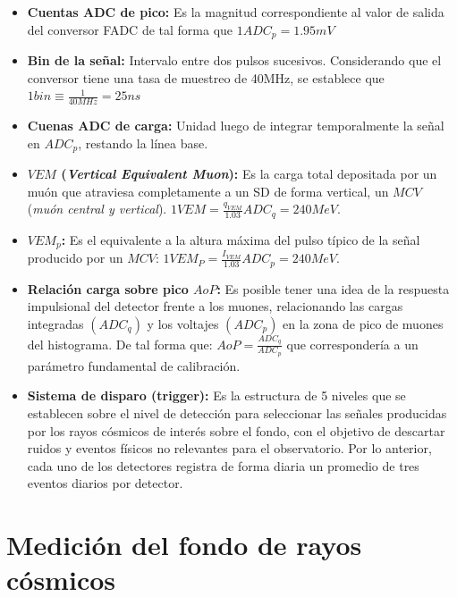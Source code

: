 \begin{itemize}
    \item \textbf{Cuentas ADC de pico:} Es la magnitud correspondiente al valor de salida del conversor FADC de tal forma que $1ADC_{p}= 1.95mV$ 
    \item \textbf{Bin de la señal:} Intervalo entre dos pulsos sucesivos. Considerando que el conversor tiene una tasa de muestreo de 40MHz, se establece que $1bin\equiv \frac{1}{40MHz} = 25ns$
    \item \textbf{Cuenas ADC de carga:} Unidad luego de integrar temporalmente la señal en $ADC_{p}$, restando la línea base.
    \item \textbf{$VEM$ (\textit{Vertical Equivalent Muon}):} Es la carga total depositada por un muón que atraviesa completamente a un SD de forma vertical, un $MCV$ (\textit{muón central y vertical}). $1VEM=\frac{q_{VEM}}{1.03}ADC_{q}=240MeV$.
    \item \textbf{$VEM_{p}$:} Es el equivalente a la altura máxima del pulso típico de la señal producido por un $MCV$: $1VEM_{P}=\frac{I_{VEM}}{1.03}ADC_{p}=240MeV$.
    \item \textbf{Relación carga sobre pico $AoP$: } Es posible tener una idea de la respuesta impulsional del detector frente a los muones, relacionando las cargas integradas $(ADC_{q})$ y los voltajes $(ADC_{p})$ en la zona de pico de muones del histograma. De tal forma que: $AoP=\frac{ADC_{q}}{ADC_{p}}$ que correspondería a un parámetro fundamental de calibración.
    \item \textbf{Sistema de disparo (trigger):} Es la estructura de 5 niveles que se establecen sobre el nivel de detección para seleccionar las señales producidas por los rayos cósmicos de interés sobre el fondo, con el objetivo de descartar ruidos y eventos físicos no relevantes para el observatorio. Por lo anterior, cada uno de los detectores registra de forma diaria un promedio de tres eventos diarios por detector.
\end{itemize}

\section{Medición del fondo de rayos cósmicos}

